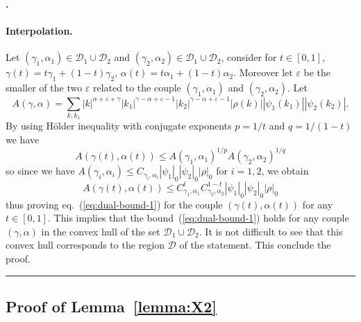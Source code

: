 \documentclass[a4paper,12pt,reqno]{article}
\newcommand{\eps}{\varepsilon}
\newcommand{\DD}{\mathcal{D}}
\newenvironment{proof}[1][Proof]{\textbf{#1.} }{\ \rule{0.5em}{0.5em}}
\begin{document}
\begin{proof}[]
\paragraph{Interpolation.}
Let $(\gamma_1,\alpha_1) \in \DD_1 \cup \DD_2$ and  $(\gamma_2,\alpha_2)
\in  \DD_1 \cup \DD_2$, consider for $t\in[0,1]$,  $\gamma(t)=t \gamma_1 +
(1-t) \gamma_2$,  $\alpha(t)=t \alpha_1 +
(1-t) \alpha_2$. Moreover let $\eps$ be the smaller of the two $\eps$ related to the couple $(\gamma_1,\alpha_1)$ and $(\gamma_2,\alpha_2)$.
Let
$$
A(\gamma,\alpha) = \sum_{k, k_1}  |k|^{\alpha+\eps+\gamma} |k_1|^{\gamma-\alpha+\eps-1} |k_2|^{\gamma-\alpha+\eps-1}
|\rho(k)| |\psi_1(k_1)| |\psi_2(k_2)|.
$$ 
By using H\"older inequality with conjugate exponents $p = 1/t$ and $q
= 1/(1-t)$ we have
$$
A(\gamma(t),\alpha(t)) \le A(\gamma_1,\alpha_1)^{1/p} A(\gamma_2,\alpha_2)^{1/q}
$$
so since we have
$
A(\gamma_i,\alpha_i) \le C_{\gamma_i,\alpha_i} |\psi_1|_0 |\psi_2|_0 |\rho|_0
$
for $i=1,2$, we obtain
$$
A(\gamma(t),\alpha(t)) \le C_{\gamma_1,\alpha_1}^{t}
C_{\gamma_2,\alpha_2}^{1-t} |\psi_1|_0 |\psi_2|_0 |\rho|_0
$$
thus proving eq.~(\ref{eq:dual-bound-1}) for the couple
$(\gamma(t),\alpha(t))$ for any $t\in [0,1]$. This implies that the
bound~(\ref{eq:dual-bound-1}) holds for any couple $(\gamma,\alpha)$
in the convex hull of the set $\DD_1 \cup \DD_2$. 
It is not difficult to see that this convex hull corresponds to the
region $\DD$ of the statement. This conclude the proof. 
\end{proof}



\subsection{Proof of Lemma~\ref{lemma:X2}}
\end{document}

